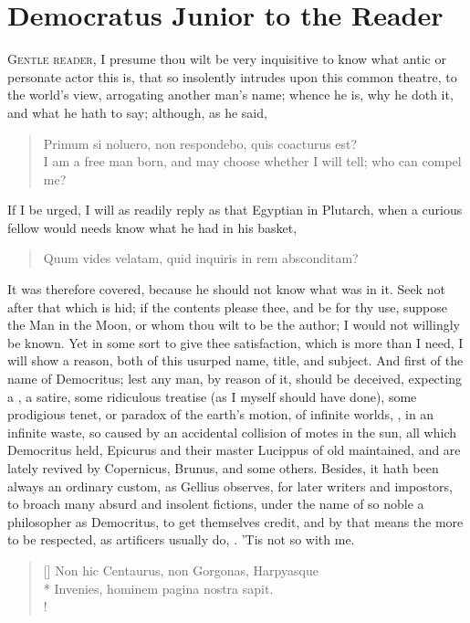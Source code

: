 \chapter{Democratus Junior to the Reader}
{\lettrine[image,lines=5,findent=5pt,nindent=0pt]{G}{entle reader}, I presume thou wilt be very inquisitive to know what
antic or personate actor this is, that so insolently intrudes upon this
common theatre, to the world's view, arrogating another man's name;
whence he is, why he doth it, and what he hath to say; although, as
he said,

\begin{quote}
\textlatin{Primum si noluero, non respondebo, quis coacturus est?}\\
I am a free man born, and may choose whether I will tell; who can compel me?
\end{quote}
If I be urged, I will as readily reply as that Egyptian in Plutarch,
when a curious fellow would needs know what he had in his basket,
\begin{quote}
\textlatin{Quum vides velatam, quid inquiris in rem absconditam?}
\end{quote}
It was therefore covered, because he should not know what was in it. Seek not after that
which is hid; if the contents please thee, and be for thy use,
suppose the Man in the Moon, or whom thou wilt to be the author; I
would not willingly be known. Yet in some sort to give thee
satisfaction, which is more than I need, I will show a reason, both of
this usurped name, title, and subject. And first of the name of
Democritus; lest any man, by reason of it, should be deceived,
expecting a , a satire, some ridiculous treatise (as I myself
should have done), some prodigious tenet, or paradox of the earth's
motion, of infinite worlds, , in an infinite waste, so caused by an accidental collision
of motes in the sun, all which Democritus held, Epicurus and their
master Lucippus of old maintained, and are lately revived by
Copernicus, Brunus, and some others. Besides, it hath been always an
ordinary custom, as Gellius observes, for later writers and
impostors, to broach many absurd and insolent fictions, under the name
of so noble a philosopher as Democritus, to get themselves credit, and
by that means the more to be respected, as artificers usually do,
. 'Tis not so with me.
\settowidth{\versewidth}{Non hic Centaurus, non Gorgonas, Harpyasque}
\begin{verse}[\versewidth]
\textlatin{Non hic Centaurus, non Gorgonas, Harpyasque}\\*
\textlatin{Invenies, hominem pagina nostra sapit.}\\!


\end{verse}}
